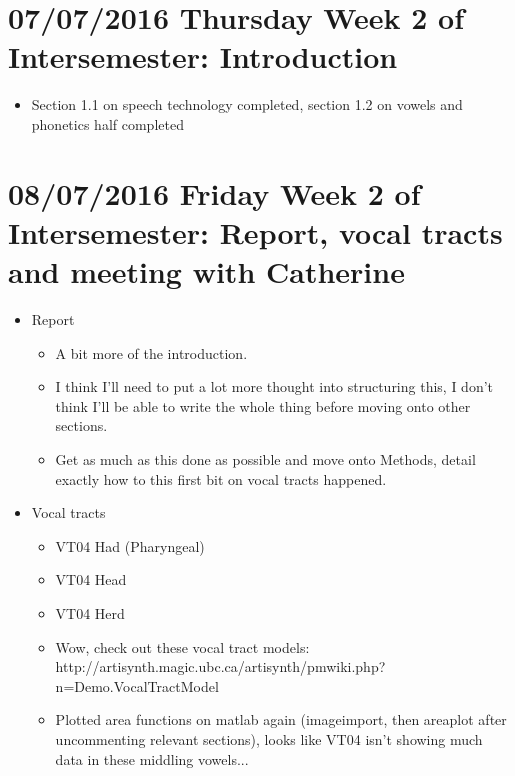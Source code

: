 \documentclass{article}
\begin{document}
\section*{07/07/2016 Thursday Week 2 of Intersemester: Introduction}
\begin{itemize}
    \item Section 1.1 on speech technology completed, section 1.2 on vowels and phonetics half completed
\end{itemize}

\section*{08/07/2016 Friday Week 2 of Intersemester: Report, vocal tracts and meeting with Catherine}
\begin{itemize}

    \item Report
    \begin{itemize}
        \item A bit more of the introduction. 
        \item I think I'll need to put a lot more thought into structuring this, I don't think I'll be able to write the whole thing before moving onto other sections.
        \item Get as much as this done as possible and move onto Methods, detail exactly how to this first bit on vocal tracts happened.
    \end{itemize}
    
    \item Vocal tracts
    \begin{itemize}
        \item VT04 Had (Pharyngeal)
        \item VT04 Head 
        \item VT04 Herd
        \item Wow, check out these vocal tract models: http://artisynth.magic.ubc.ca/artisynth/pmwiki.php?n=Demo.VocalTractModel
        \item Plotted area functions on matlab again (imageimport, then areaplot after uncommenting relevant sections), looks like  VT04 isn't showing much data in these middling vowels...
    \end{itemize}
    

\end{itemize}
\end{document}
